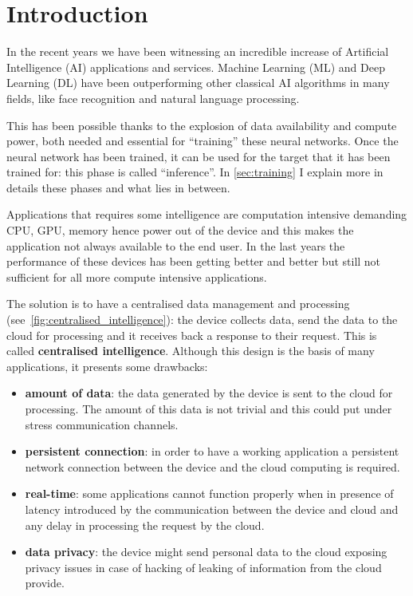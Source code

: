 \chapter{Introduction}\label{ch:introduction}
In the recent years we have been witnessing an incredible increase of
Artificial Intelligence (AI) applications and services.
Machine Learning (ML) and Deep Learning (DL) have been outperforming other
classical AI algorithms in many fields, like face recognition and natural
language processing.

This has been possible thanks to the explosion of data availability and compute
power, both needed and essential for ``training'' these neural networks.
Once the neural network has been trained, it can be used for the target that it
has been trained for: this phase is called ``inference''.
In \autoref{sec:training} I explain more in details these phases and what lies
in between.

Applications that requires some intelligence are computation intensive
demanding CPU, GPU, memory hence power out of the device and this makes the
application not always available to the end user.
In the last years the performance of these devices has been getting better and
better but still not sufficient for all more compute intensive applications.

The solution is to have a centralised data management and processing
(see~\ref{fig:centralised_intelligence}): the device collects data, send the
data to the cloud for processing and it receives back a response to their
request. This is called \textbf{centralised intelligence}.
Although this design is the basis of many applications, it presents some
drawbacks:
\begin{itemize}
    \item \textbf{amount of data}: the data generated by the device is sent to
        the cloud for processing. The amount of this data is not trivial and
        this could put under stress communication channels.
    \item \textbf{persistent connection}: in order to have a working
        application a persistent network connection between the device and the
        cloud computing is required.
    \item \textbf{real-time}: some applications cannot function properly when
        in presence of latency introduced by the communication between the
        device and cloud and any delay in processing the request by the cloud.
    \item \textbf{data privacy}: the device might send personal data to the
        cloud exposing privacy issues in case of hacking of leaking of
        information from the cloud provide.
\end{itemize}


